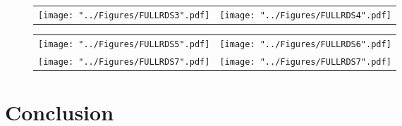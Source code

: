 \documentclass[compress,xcolor=dvipsnames]{beamer}
\begin{document}
\begin{frame}
\begin{figure}[h!]
\centering
\begin{adjustbox}{center}
\begin{tabular}{cc}
\texttt{[image: "../Figures/FULLRDS3".pdf]} & %
\texttt{[image: "../Figures/FULLRDS4".pdf]}   %
\end{tabular}
\end{adjustbox}
\end{figure}
\end{frame}

\begin{frame}
\begin{figure}[h!]
\centering
\begin{adjustbox}{center}
\begin{tabular}{cc}
\texttt{[image: "../Figures/FULLRDS5".pdf]} & %
\texttt{[image: "../Figures/FULLRDS6".pdf]}  \\%
\texttt{[image: "../Figures/FULLRDS7".pdf]} & \texttt{[image: "../Figures/FULLRDS7".pdf]}
\end{tabular}
\end{adjustbox}
\end{figure}
\end{frame}



\section{Conclusion}
\end{document}
